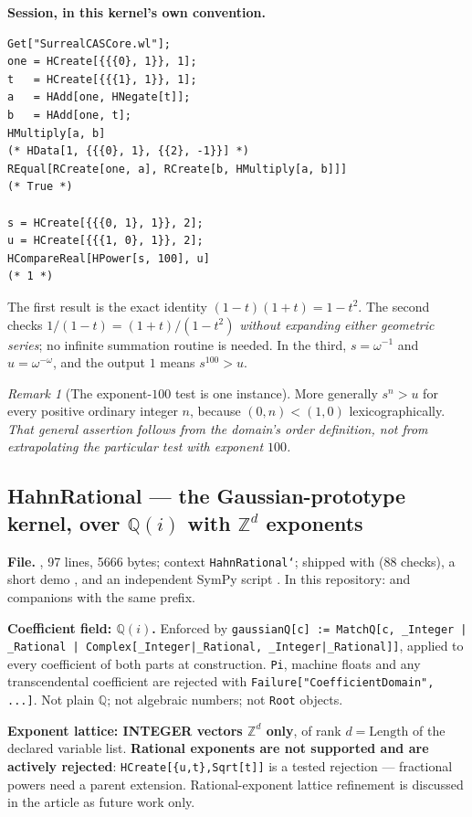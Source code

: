 \documentclass[11pt,letterpaper]{article}
\numberwithin{equation}{section}
\theoremstyle{definition}
\theoremstyle{remark}
\newtheorem{remark}[theorem]{Remark}
\newcommand{\Q}{\mathbb Q}
\newcommand{\Z}{\mathbb Z}
\begin{document}
\textbf{Session, in this kernel's own convention.}
\begin{lstlisting}
Get["SurrealCASCore.wl"];
one = HCreate[{{{0}, 1}}, 1];
t   = HCreate[{{{1}, 1}}, 1];
a   = HAdd[one, HNegate[t]];
b   = HAdd[one, t];
HMultiply[a, b]
(* HData[1, {{{0}, 1}, {{2}, -1}}] *)
REqual[RCreate[one, a], RCreate[b, HMultiply[a, b]]]
(* True *)

s = HCreate[{{{0, 1}, 1}}, 2];
u = HCreate[{{{1, 0}, 1}}, 2];
HCompareReal[HPower[s, 100], u]
(* 1 *)
\end{lstlisting}
The first result is the exact identity $(1-t)(1+t)=1-t^2$. The second checks
$1/(1-t)=(1+t)/(1-t^2)$ \emph{without expanding either geometric series}; no
infinite summation routine is needed. In the third, $s=\omega^{-1}$ and
$u=\omega^{-\omega}$, and the output $1$ means $s^{100}>u$.

\begin{remark}[The exponent-$100$ test is one instance]\label{cas:rem-100}
More generally $s^n>u$ for every positive ordinary integer $n$, because
$(0,n)<(1,0)$ lexicographically. \emph{That general assertion follows from the
domain's order definition, not from extrapolating the particular test with
exponent $100$.}
\end{remark}

\subsection{HahnRational --- the Gaussian-prototype kernel, over \texorpdfstring{$\Q(i)$ with $\Z^d$}{Q(i) with Z\textasciicircum d} exponents}
\label{cas:sub-hahnrational}
\textbf{File.} , 97 lines, 5666 bytes; context
\texttt{HahnRational`}; shipped with  (88 checks), a
short demo , and an independent SymPy script
. In this repository:
 and
companions with the same prefix.

\textbf{Coefficient field: $\Q(i)$.} Enforced by
\texttt{gaussianQ[c] := MatchQ[c, \_Integer | \_Rational | Complex[\_Integer|\_Rational, \_Integer|\_Rational]]},
applied to every coefficient of both parts at construction. \texttt{Pi}, machine
floats and any transcendental coefficient are rejected with
\texttt{Failure["CoefficientDomain", ...]}. Not plain $\Q$; not algebraic
numbers; not \texttt{Root} objects.

\textbf{Exponent lattice: INTEGER vectors $\Z^d$ only}, of rank
$d=\mathrm{Length}$ of the declared variable list. \textbf{Rational exponents
are not supported and are actively rejected}: \texttt{HCreate[\{u,t\},Sqrt[t]]}
is a tested rejection --- fractional powers need a parent extension.
Rational-exponent lattice refinement is discussed in the article as future work
only.
\end{document}
